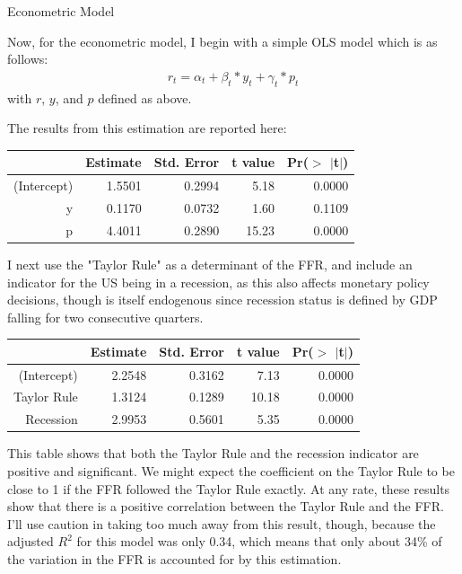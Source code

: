 \documentclass[12pt]{article}
\newenvironment{question}[2][Question]{\begin{trivlist}
\item[\hskip \labelsep {\bfseries #1}\hskip \labelsep {\bfseries #2.}]}{\end{trivlist}}
\begin{document}
\begin{question}{4} Econometric Model

Now, for the econometric model, I begin with a simple OLS model which is as follows:
\begin{align}
\nonumber
r_t = \alpha_t + {\beta}_t*y_t + {\gamma}_t*p_t
\end{align}
with $r$, $y$, and $p$ defined as above.

The results from this estimation are reported here:

\begin{table}[ht]
\centering
\begin{tabular}{rrrrr}
  \hline
 & Estimate & Std. Error & t value & Pr($>$ $|$t$|$) \\ 
  \hline
(Intercept) & 1.5501 & 0.2994 & 5.18 & 0.0000 \\ 
  y & 0.1170 & 0.0732 & 1.60 & 0.1109 \\ 
  p & 4.4011 & 0.2890 & 15.23 & 0.0000 \\ 
   \hline
\end{tabular}
\end{table}

I next use the "Taylor Rule" as a determinant of the FFR, and include an indicator for the US being in a recession, as this also affects monetary policy decisions, though is itself endogenous since recession status is defined by GDP falling for two consecutive quarters.

\begin{table}[ht]
\centering
\begin{tabular}{rrrrr}
  \hline
 & Estimate & Std. Error & t value & Pr($>$ $|$t$|$) \\ 
  \hline
(Intercept) & 2.2548 & 0.3162 & 7.13 & 0.0000 \\ 
  Taylor Rule & 1.3124 & 0.1289 & 10.18 & 0.0000 \\ 
  Recession & 2.9953 & 0.5601 & 5.35 & 0.0000 \\ 
   \hline
\end{tabular}
\end{table}

This table shows that both the Taylor Rule and the recession indicator are positive and significant. We might expect the coefficient on the Taylor Rule to be close to 1 if the FFR followed the Taylor Rule exactly. At any rate, these results show that there is a positive correlation between the Taylor Rule and the FFR. I'll use caution in taking too much away from this result, though, because the adjusted $R^2$ for this model was only 0.34, which means that only about 34\% of the variation in the FFR is accounted for by this estimation.

\end{question}
\newpage


\end{document}
